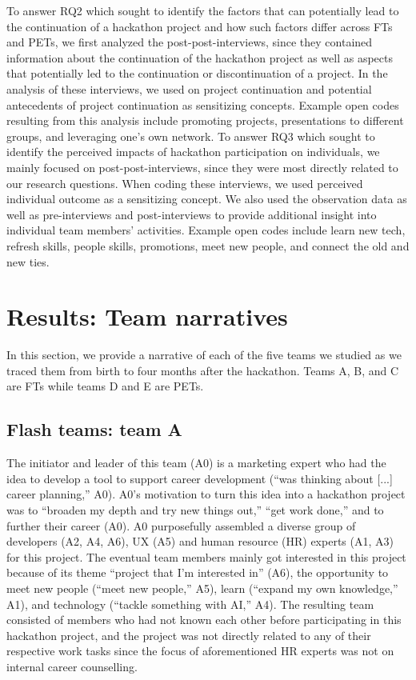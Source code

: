 \documentclass{hcij}
\begin{document}
To answer RQ2 which sought to identify the factors that can potentially lead to the continuation of a hackathon project and how such factors differ across FTs and PETs, we first analyzed the post-post-interviews, since they contained information about the continuation of the hackathon project as well as aspects that potentially led to the continuation or discontinuation of a project. In the analysis of these interviews, we used on project continuation and potential antecedents of project continuation as sensitizing concepts. Example open codes resulting from this analysis include promoting projects, presentations to different groups, and leveraging one’s own network.
To answer RQ3 which sought to identify the perceived impacts of hackathon participation on individuals, we mainly focused on post-post-interviews, since they were most directly related to our research questions. When coding these interviews, we used perceived individual outcome as a sensitizing concept. We also used the observation data as well as pre-interviews and post-interviews to provide additional insight into individual team members’ activities. Example open codes include learn new tech, refresh skills, people skills, promotions, meet new people, and connect the old and new ties.

\section{Results: Team narratives}
In this section, we provide a narrative of each of the five teams we studied as we traced them from birth to four months after the hackathon. Teams A, B, and C are FTs while teams D and E are PETs.

\subsection{Flash teams: team A}
The initiator and leader of this team (A0) is a marketing expert who had the idea to develop a tool to support career development (“was thinking about [...] career planning,” A0). A0’s motivation to turn this idea into a hackathon project was to “broaden my depth and try new things out,” “get work done,” and to further their career (A0). A0 purposefully assembled a diverse group of developers (A2, A4, A6), UX (A5) and human resource (HR) experts (A1, A3) for this project. The eventual team members mainly got interested in this project because of its theme “project that I’m interested in” (A6), the opportunity to meet new people (“meet new people,” A5), learn (“expand my own knowledge,” A1), and technology (“tackle something with AI,” A4). The resulting team consisted of members who had not known each other before participating in this hackathon project, and the project was not directly related to any of their respective work tasks since the focus of aforementioned HR experts was not on internal career counselling.
\end{document}

